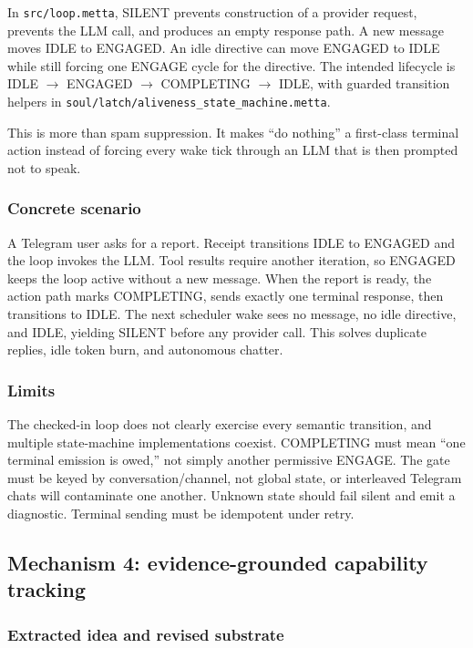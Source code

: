 \documentclass[11pt]{article}
\begin{document}
In \texttt{src/loop.metta}, SILENT prevents construction of a provider request,
prevents the LLM call, and produces an empty response path.  A new message moves
IDLE to ENGAGED.  An idle directive can move ENGAGED to IDLE while still forcing
one ENGAGE cycle for the directive.  The intended lifecycle is
IDLE \(\rightarrow\) ENGAGED \(\rightarrow\) COMPLETING \(\rightarrow\) IDLE,
with guarded transition helpers in \texttt{soul/latch/aliveness\_state\_machine.metta}.

This is more than spam suppression.  It makes ``do nothing'' a first-class
terminal action instead of forcing every wake tick through an LLM that is then
prompted not to speak.

\subsubsection{Concrete scenario}

A Telegram user asks for a report.  Receipt transitions IDLE to ENGAGED and the
loop invokes the LLM.  Tool results require another iteration, so ENGAGED keeps
the loop active without a new message.  When the report is ready, the action path
marks COMPLETING, sends exactly one terminal response, then transitions to IDLE.
The next scheduler wake sees no message, no idle directive, and IDLE, yielding
SILENT before any provider call.  This solves duplicate replies, idle token burn,
and autonomous chatter.

\subsubsection{Limits}

The checked-in loop does not clearly exercise every semantic transition, and
multiple state-machine implementations coexist.  COMPLETING must mean ``one
terminal emission is owed,'' not simply another permissive ENGAGE.  The gate must
be keyed by conversation/channel, not global state, or interleaved Telegram chats
will contaminate one another.  Unknown state should fail silent and emit a
diagnostic.  Terminal sending must be idempotent under retry.

\subsection{Mechanism 4: evidence-grounded capability tracking}

\subsubsection{Extracted idea and revised substrate}
\end{document}
